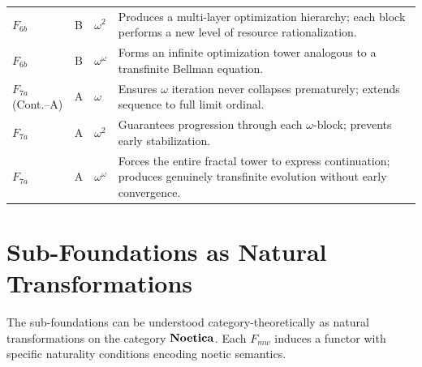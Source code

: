\begin{longtable}{p{2.2cm}|c|p{1.5cm}|p{5.5cm}}
$F_{6b}$ & B & $\omega^2$
& Produces a multi-layer optimization hierarchy;
  each block performs a new level of resource rationalization. \\

$F_{6b}$ & B & $\omega^\omega$
& Forms an infinite optimization tower analogous to
  a transfinite Bellman equation. \\

\midrule

$F_{7a}$ (Cont.--A) & A & $\omega$
& Ensures $\omega$ iteration never collapses prematurely;
  extends sequence to full limit ordinal. \\

$F_{7a}$ & A & $\omega^2$
& Guarantees progression through each $\omega$-block;
  prevents early stabilization. \\

$F_{7a}$ & A & $\omega^\omega$
& Forces the entire fractal tower to express continuation;
  produces genuinely transfinite evolution without early convergence. \\

\end{longtable}

\section{Sub-Foundations as Natural Transformations}

The sub-foundations can be understood category-theoretically as natural
transformations on the category $\mathbf{Noetica}$. Each $F_{mw}$ induces a functor
with specific naturality conditions encoding noetic semantics.

